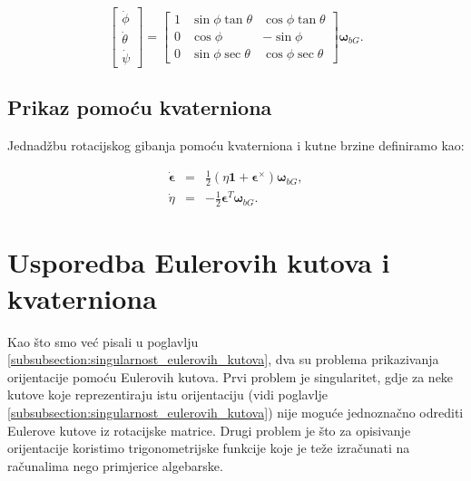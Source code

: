 \documentclass[times, utf8, diplomski, numeric]{templates/template}
\begin{document}
{{{            \begin{equation}
                \begin{bmatrix}
                    \dot{\phi} \\
                    \dot{\theta} \\
                    \dot{\psi}
                \end{bmatrix}
                =
                \begin{bmatrix}
                    1 & \sin\phi\tan\theta & \cos\phi\tan\theta \\
                    0 & \cos\phi & -\sin\phi \\
                    0 & \sin\phi\sec\theta & \cos\phi\sec\theta
                \end{bmatrix}
                \boldsymbol{\omega}_{bG}.
            \end{equation}
        }

        \subsection{Prikaz pomoću kvaterniona}{
            Jednadžbu rotacijskog gibanja pomoću kvaterniona i kutne brzine definiramo kao:

            \begin{equation}
            \begin{array}{rcl}
                \dot{\boldsymbol\epsilon} &  = & \frac{1}{2}(\eta\textbf{1} + \boldsymbol{\epsilon}^\times)\boldsymbol{\omega}_{bG}, \\
                \dot{\eta} & = & -\frac{1}{2}\boldsymbol{\epsilon}^T\boldsymbol{\omega}_{bG}.
            \end{array}
            \end{equation}
        }
    }

    \section{Usporedba Eulerovih kutova i kvaterniona}{
        Kao što smo već pisali u poglavlju \ref{subsubsection:singularnost_eulerovih_kutova}, dva su problema prikazivanja orijentacije pomoću Eulerovih kutova. Prvi problem je singularitet, gdje za neke kutove koje reprezentiraju istu orijentaciju (vidi poglavlje \ref{subsubsection:singularnost_eulerovih_kutova}) nije moguće jednoznačno odrediti Eulerove kutove iz rotacijske matrice. Drugi problem je što za opisivanje orijentacije koristimo trigonometrijske funkcije koje je teže izračunati na računalima nego primjerice algebarske.

}}
\end{document}
